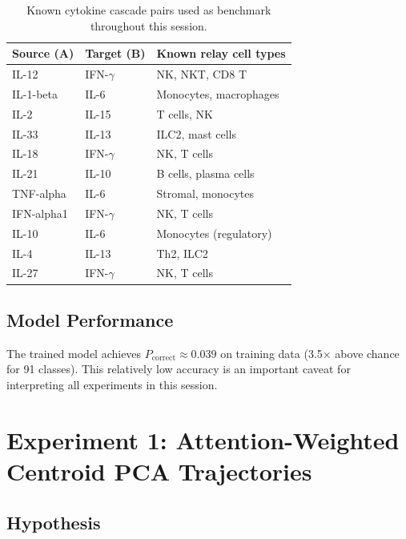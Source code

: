 \documentclass[11pt,a4paper]{article}
\begin{document}
\begin{table}[H]
\centering
\caption{Known cytokine cascade pairs used as benchmark throughout this session.}
\begin{tabular}{lll}
\toprule
\textbf{Source (A)} & \textbf{Target (B)} & \textbf{Known relay cell types} \\
\midrule
IL-12       & IFN-$\gamma$  & NK, NKT, CD8 T \\
IL-1-beta   & IL-6          & Monocytes, macrophages \\
IL-2        & IL-15         & T cells, NK \\
IL-33       & IL-13         & ILC2, mast cells \\
IL-18       & IFN-$\gamma$  & NK, T cells \\
IL-21       & IL-10         & B cells, plasma cells \\
TNF-alpha   & IL-6          & Stromal, monocytes \\
IFN-alpha1  & IFN-$\gamma$  & NK, T cells \\
IL-10       & IL-6          & Monocytes (regulatory) \\
IL-4        & IL-13         & Th2, ILC2 \\
IL-27       & IFN-$\gamma$  & NK, T cells \\
\bottomrule
\end{tabular}
\end{table}

\subsection{Model Performance}

The trained model achieves $P_{\text{correct}} \approx 0.039$ on training data
(3.5$\times$ above chance for 91 classes). This relatively low accuracy is
an important caveat for interpreting all experiments in this session.

\section{Experiment 1: Attention-Weighted Centroid PCA Trajectories}

\subsection{Hypothesis}
\end{document}
